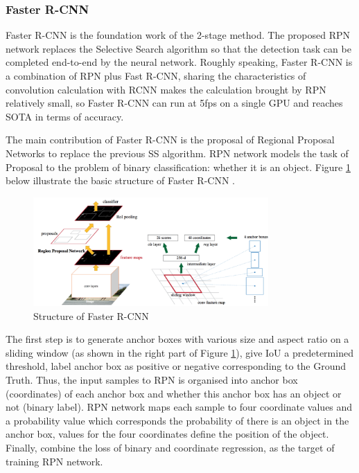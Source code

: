 \subsubsection{Faster R-CNN}
Faster R-CNN \cite{fasterrcnn} is the foundation work of the 2-stage method. The proposed RPN network replaces the Selective Search algorithm so that the detection task can be completed end-to-end by the neural network. Roughly speaking, Faster R-CNN is a combination of RPN plus Fast R-CNN, sharing the characteristics of convolution calculation with RCNN makes the calculation brought by RPN relatively small, so Faster R-CNN can run at 5fps on a single GPU and reaches SOTA in terms of accuracy.

The main contribution of Faster R-CNN \cite{fasterrcnn} is the proposal of Regional Proposal Networks to replace the previous SS algorithm. RPN network models the task of Proposal to the problem of binary classification: whether it is an object. Figure \ref{fig:fasterrcnn} below illustrate the basic structure of Faster R-CNN \cite{fasterrcnn}.

\begin{figure}[h!]
\centering
\includegraphics[width=0.8\textwidth]{fasterrcnn.pdf}
\caption{Structure of Faster R-CNN \cite{fasterrcnn}}
\label{fig:fasterrcnn}
\end{figure}

The first step is to generate anchor boxes with various size and aspect ratio on a sliding window (as shown in the right part of Figure \ref{fig:fasterrcnn}), give IoU a predetermined threshold, label anchor box as positive or negative corresponding to the Ground Truth. Thus, the input samples to RPN is organised into anchor box (coordinates) of each anchor box and whether this anchor box has an object or not (binary label). RPN network maps each sample to four coordinate values and a probability value which corresponds the probability of there is an object in the anchor box, values for the four coordinates define the position of the object. Finally, combine the loss of binary and coordinate regression, as the target of training RPN network.

